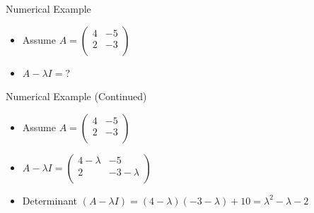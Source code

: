 \documentclass[serif, aspectratio=169]{beamer}
\begin{document}
\begin{frame}{Numerical Example}
    \begin{itemize}
        \item Assume $A = \begin{pmatrix}  
4 & -5  \\
2 & -3 \\
\end{pmatrix} $
    \item $A - \lambda I =  ?$
    \end{itemize}
\end{frame}

\begin{frame}{Numerical Example (Continued)}
    \begin{itemize}
        \item Assume $A = \begin{pmatrix}  
4 & -5  \\
2 & -3 \\
\end{pmatrix} $
    \item $A - \lambda I =  \begin{pmatrix}  
4 - \lambda & -5  \\
2 & -3 - \lambda \\
\end{pmatrix}$
    \item Determinant $(A - \lambda I) = (4 - \lambda) (-3 - \lambda) + 10 = \lambda^2 - \lambda - 2$ 
    \end{itemize}
\end{frame}
\end{document}
